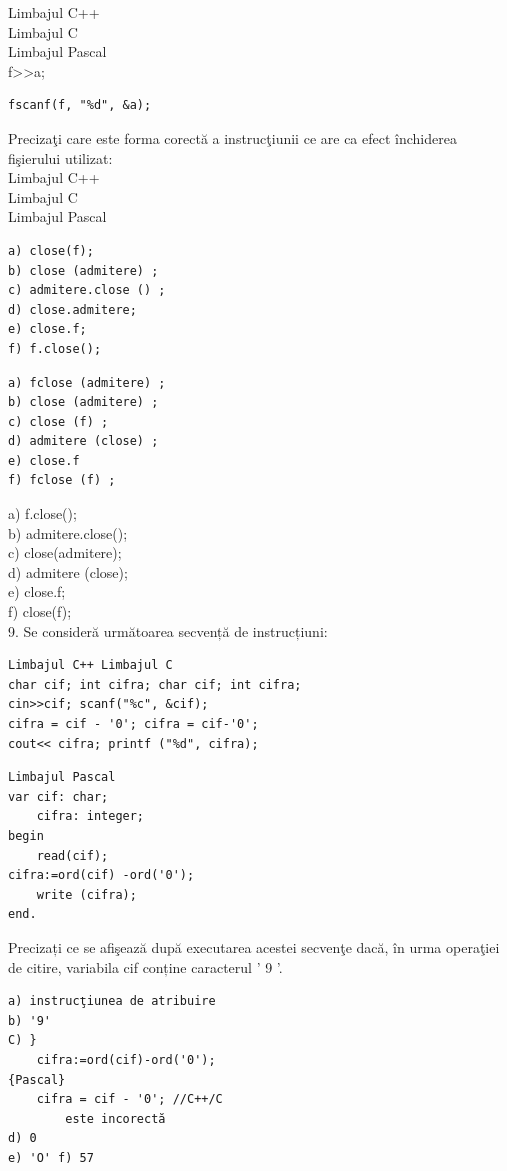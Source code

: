 \documentclass[10pt]{article}
\begin{document}
Limbajul C++\\
Limbajul C\\
Limbajul Pascal\\
f>>a;

\begin{verbatim}
fscanf(f, "%d", &a);
\end{verbatim}

Precizaţi care este forma corectă a instrucţiunii ce are ca efect închiderea fişierului utilizat:\\
Limbajul C++\\
Limbajul C\\
Limbajul Pascal

\begin{verbatim}
a) close(f);
b) close (admitere) ;
c) admitere.close () ;
d) close.admitere;
e) close.f;
f) f.close();
\end{verbatim}

\begin{verbatim}
a) fclose (admitere) ;
b) close (admitere) ;
c) close (f) ;
d) admitere (close) ;
e) close.f
f) fclose (f) ;
\end{verbatim}

a) f.close();\\
b) admitere.close();\\
c) close(admitere);\\
d) admitere (close);\\
e) close.f;\\
f) close(f);\\
9. Se consideră următoarea secvență de instrucțiuni:

\begin{verbatim}
Limbajul C++ Limbajul C
char cif; int cifra; char cif; int cifra;
cin>>cif; scanf("%c", &cif);
cifra = cif - '0'; cifra = cif-'0';
cout<< cifra; printf ("%d", cifra);
\end{verbatim}

\begin{verbatim}
Limbajul Pascal
var cif: char;
    cifra: integer;
begin
    read(cif);
cifra:=ord(cif) -ord('0');
    write (cifra);
end.
\end{verbatim}

Precizați ce se afişează după executarea acestei secvenţe dacă, în urma operaţiei de citire, variabila cif conține caracterul ' 9 '.

\begin{verbatim}
a) instrucţiunea de atribuire
b) '9'
C) }
    cifra:=ord(cif)-ord('0');
{Pascal}
    cifra = cif - '0'; //C++/C
        este incorectă
d) 0
e) 'O' f) 57
\end{verbatim}
\end{document}
